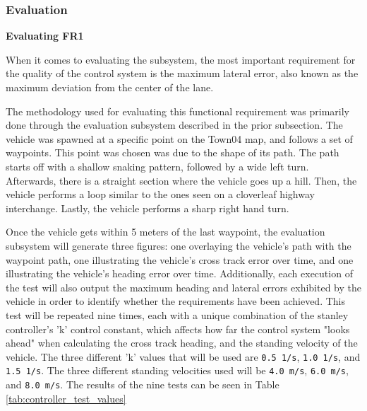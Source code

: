 \documentclass[titlepage, draft]{article}
\begin{document}
{\subsubsection{Evaluation}
\textbf{Evaluating FR1}

When it comes to evaluating the subsystem, the most important requirement for the quality of the control system is the maximum lateral error, also known as the maximum deviation from the center of the lane.

The methodology used for evaluating this functional requirement was primarily done through the evaluation subsystem described in the prior subsection. The vehicle was spawned at a specific point on the Town04 map, and follows a set of waypoints. This point was chosen was due to the shape of its path. The path starts off with a shallow snaking pattern, followed by a wide left turn. Afterwards, there is a straight section where the vehicle goes up a hill. Then, the vehicle performs a loop similar to the ones seen on a cloverleaf highway interchange. Lastly, the vehicle performs a sharp right hand turn.

Once the vehicle gets within 5 meters of the last waypoint, the evaluation subsystem will generate three figures: one overlaying the vehicle's path with the waypoint path, one illustrating the vehicle's cross track error over time, and one illustrating the vehicle's heading error over time. Additionally, each execution of the test will also output the maximum heading and lateral errors exhibited by the vehicle in order to identify whether the requirements have been achieved. This test will be repeated nine times, each with a unique combination of the stanley controller's 'k' control constant, which affects how far the control system "looks ahead" when calculating the cross track heading, and the standing velocity of the vehicle. The three different 'k' values that will be used are \texttt{0.5 1/s}, \texttt{1.0 1/s}, and \texttt{1.5 1/s}. The three different standing velocities used will be \texttt{4.0 m/s}, \texttt{6.0 m/s}, and \texttt{8.0 m/s}. The results of the nine tests can be seen in Table \ref{tab:controller_test_values}

}
\end{document}
